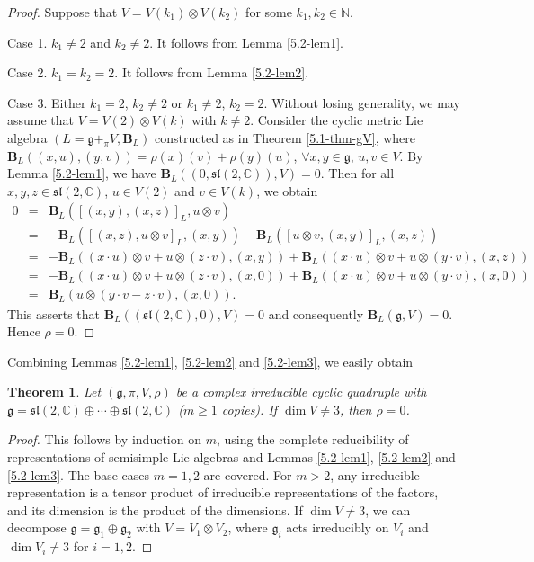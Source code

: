 \documentclass[reqno]{amsart}
\newtheorem{thm}{Theorem}[section]
\theoremstyle{definition}
\begin{document}
\begin{proof}
Suppose that $V=V(k_{1})\otimes V(k_{2})$ for some $k_{1},k_{2}\in \mathbb{N}$.

Case 1. $k_{1}\neq2$ and $k_{2}\neq2$. It follows from Lemma \ref{5.2-lem1}.

Case 2. $k_{1}=k_{2}=2$. It follows from Lemma \ref{5.2-lem2}.

Case 3. Either $k_{1}=2$, $k_{2}\neq2$ or $k_{1}\neq2$, $k_{2}=2$.
Without losing generality, we may assume that $V=V(2)\otimes V(k)$ with $k\neq2$.
Consider the cyclic metric Lie algebra  $(L=\mathfrak{g}+_{\pi}V,\mathbf{B}_{L})$ constructed as
in Theorem \ref{5.1-thm-gV},
where  $\mathbf{B}_{L}((x,u),(y,v))=\rho(x)(v)+\rho(y)(u)$, $\forall x,y\in \mathfrak{g}$, $u,v\in V$.
By Lemma \ref{5.2-lem1}, we have
$\mathbf{B}_{L}((0,\mathfrak{sl}(2,\mathbb{C})),V)=0$.
Then for all $x,y,z\in \mathfrak{sl}(2,\mathbb{C})$, $u\in V(2)$ and $v\in V(k)$, we obtain
\begin{eqnarray*}
  0 &=& \mathbf{B}_{L}([(x,y),(x,z)]_{L},u\otimes v) \\
   &=&  -\mathbf{B}_{L}([(x,z),u\otimes v]_{L},(x,y))-\mathbf{B}_{L}([u\otimes v,(x,y)]_{L},(x,z))\\
   &=& -\mathbf{B}_{L}((x\cdot u)\otimes v+u\otimes (z\cdot v),(x,y))
   +\mathbf{B}_{L}((x\cdot u)\otimes v+u\otimes (y\cdot v),(x,z)) \\
   &=& -\mathbf{B}_{L}((x\cdot u)\otimes v+u\otimes (z\cdot v),(x,0))
   +\mathbf{B}_{L}((x\cdot u)\otimes v+u\otimes (y\cdot v),(x,0)) \\
   &=&  \mathbf{B}_{L}( u\otimes (y\cdot v-z\cdot v),(x,0)).
\end{eqnarray*}
This asserts that $\mathbf{B}_{L}((\mathfrak{sl}(2,\mathbb{C}),0),V)=0$ and consequently
$\mathbf{B}_{L}(\mathfrak{g},V)=0$. Hence  $\rho=0$.
\end{proof}
Combining Lemmas \ref{5.2-lem1}, \ref{5.2-lem2} and \ref{5.2-lem3}, we easily obtain
\begin{thm}\label{5.2-thm1}
Let $(\mathfrak{g},\pi,V,\rho)$ be a complex irreducible cyclic quadruple with
  $\mathfrak{g}=\mathfrak{sl}(2,\mathbb{C})\oplus\cdots\oplus\mathfrak{sl}(2,\mathbb{C})$
  ($m\geq1$ copies).
If $\dim V\neq 3$, then $\rho=0$.
\end{thm}
\begin{proof}
This follows by induction on $m$, using the complete reducibility of representations of semisimple Lie algebras and Lemmas \ref{5.2-lem1}, \ref{5.2-lem2} and \ref{5.2-lem3}. The base cases $m=1,2$ are covered.
For $m>2$, any irreducible representation is a tensor product of irreducible representations of the factors, and its dimension is the product of the dimensions. If $\dim V\neq 3$, we can decompose $\mathfrak{g}=\mathfrak{g}_{1}\oplus \mathfrak{g}_{2}$ with $V=V_{1}\otimes V_{2}$, where $\mathfrak{g}_{i}$ acts irreducibly on $V_{i}$ and $\dim V_{i}\neq 3$ for $i=1,2$.
\end{proof}
\end{document}
